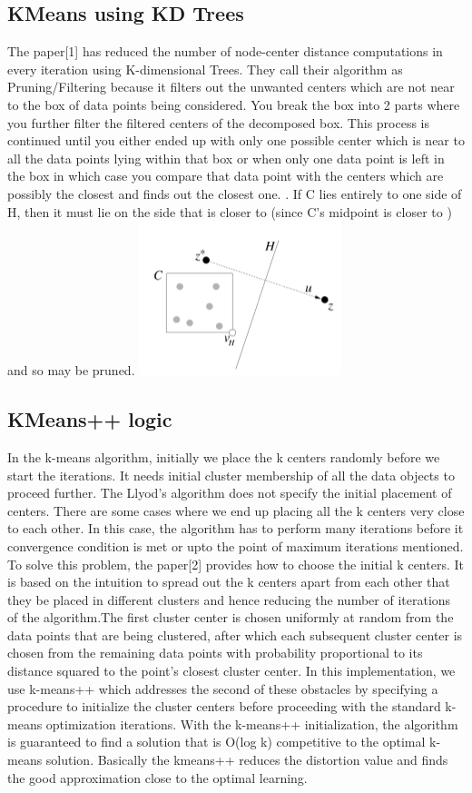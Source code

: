 \documentclass[conference]{IEEEtran}
\newcommand{\Z}{\mathbb{Z}}
\begin{document}
\subsection{KMeans using KD Trees}
The paper[1] has reduced the number of node-center distance computations in every iteration using K-dimensional Trees. They call their algorithm as Pruning/Filtering because it filters out the unwanted centers which are not near to the box of data points being considered. You break the box into 2 parts  where you further filter the filtered centers of the decomposed box. This process is continued until you either ended up with only one possible center which is near to all the data points lying within that box or when only one data point is left in the box in which case you compare that data point with the centers which are possibly the closest and finds out the closest one. . If C lies entirely to one side of H, then it must lie on the side that is closer to \Z (since C's midpoint is closer to \Z ) and so \Z  may be pruned. 
\includegraphics[scale =0.68]{Pruning.png}

\subsection{KMeans++ logic}
In the k-means algorithm, initially we place the k centers randomly before we start the iterations. It needs initial cluster membership of all the data objects to proceed further. The Llyod’s algorithm does not specify the initial placement of centers. There are some cases where we end up placing all the k centers very close to each other. In this case, the algorithm has to perform many iterations before it convergence condition is met or upto the point of maximum iterations mentioned. To solve this problem, the paper[2] provides how to choose the initial k centers. It is based on the intuition to spread out the k centers apart from each other that they be placed in different clusters and hence reducing the number of iterations of the algorithm.The first cluster center is chosen uniformly at random from the data points that are being clustered, after which each subsequent cluster center is chosen from the remaining data points with probability proportional to its distance squared to the point's closest cluster center. In this implementation, we use k-means++ which addresses the second of these obstacles by specifying a procedure to initialize the cluster centers before proceeding with the standard k-means optimization iterations. With the k-means++ initialization, the algorithm is guaranteed to find a solution that is O(log k) competitive to the optimal k-means solution. Basically the kmeans++ reduces the distortion value and finds the good approximation close to the optimal learning.
\end{document}
